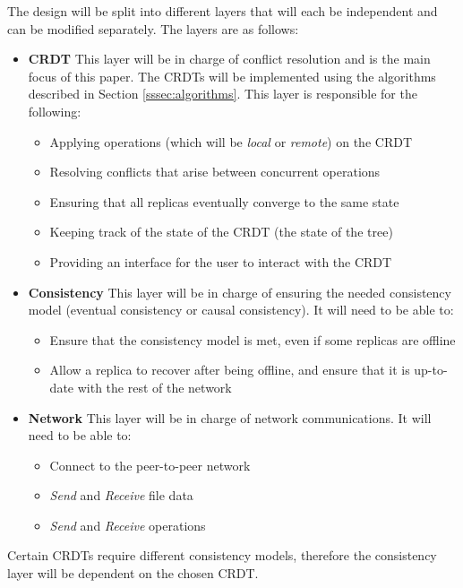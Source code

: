 \documentclass[12pt]{article}
\begin{document}
The design will be split into different layers that will each be independent and can be modified separately. The layers are as follows:
\begin{itemize}
    \item \textbf{CRDT} This layer will be in charge of conflict resolution and is the main focus of this paper. The CRDTs will be implemented using the algorithms described in Section \ref{sssec:algorithms}. This layer is responsible for the following: 
        \begin{itemize}
            \item Applying operations (which will be \textit{local} or \textit{remote}) on the CRDT
            \item Resolving conflicts that arise between concurrent operations 
            \item Ensuring that all replicas eventually converge to the same state
            \item Keeping track of the state of the CRDT (the state of the tree)
            \item Providing an interface for the user to interact with the CRDT
        \end{itemize}

    \item \textbf{Consistency} This layer will be in charge of ensuring the needed consistency model (eventual consistency or causal consistency). It will need to be able to:
        \begin{itemize}
            \item Ensure that the consistency model is met, even if some replicas are offline
            \item Allow a replica to recover after being offline, and ensure that it is up-to-date with the rest of the network
        \end{itemize}
    \item \textbf{Network} This layer will be in charge of network communications. It will need to be able to:
        \begin{itemize}
            \item Connect to the peer-to-peer network
            \item \textit{Send} and \textit{Receive} file data
            \item \textit{Send} and \textit{Receive} operations
        \end{itemize}
\end{itemize}
Certain CRDTs require different consistency models, therefore the consistency layer will be dependent on the chosen CRDT. \par
\end{document}
